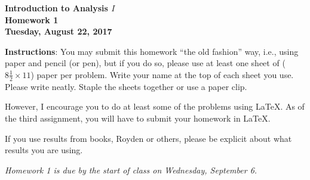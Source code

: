 \documentclass{article}%
\begin{document}
\begin{center}
\textbf{Introduction to Analysis $I$\\Homework 1\\Tuesday, August 22, 2017}\bigskip
\end{center}

\noindent\textbf{Instructions}: You may submit this homework ``the old fashion'' way, i.e., using paper and pencil (or pen), but if you do so, please use at least one sheet of ($8\frac{1}{2}%
\times11$) paper per problem. Write your name at the top of each sheet you
use. Please write neatly. Staple the sheets together or use a paper clip.

However, I encourage you to do at least some of the problems using LaTeX.  As of the third assignment, you will have to submit your homework in LaTeX.

\noindent If you use results from books, Royden or others, please be explicit about what results you are using.



\begin{center}
\emph{Homework 1 is due by the start of class on Wednesday, September 6.}
\end{center} 
\medskip
\end{document}
